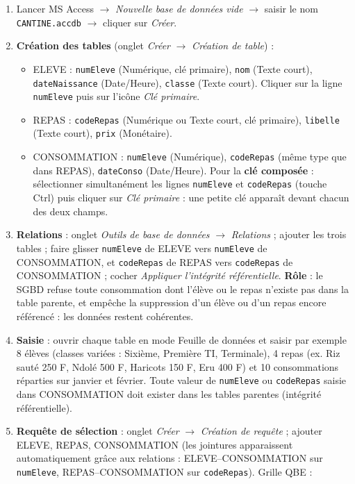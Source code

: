 \documentclass[11pt]{article}
\begin{document}
\begin{corrige}
\begin{enumerate}
  \item Lancer MS Access $\rightarrow$ \emph{Nouvelle base de données vide} $\rightarrow$ saisir le nom \texttt{CANTINE.accdb} $\rightarrow$ cliquer sur \emph{Créer}.
  \item \textbf{Création des tables} (onglet \emph{Créer} $\rightarrow$ \emph{Création de table}) :
  \begin{itemize}
    \item ELEVE : \texttt{numEleve} (Numérique, clé primaire), \texttt{nom} (Texte court), \texttt{dateNaissance} (Date/Heure), \texttt{classe} (Texte court). Cliquer sur la ligne \texttt{numEleve} puis sur l'icône \emph{Clé primaire}.
    \item REPAS : \texttt{codeRepas} (Numérique ou Texte court, clé primaire), \texttt{libelle} (Texte court), \texttt{prix} (Monétaire).
    \item CONSOMMATION : \texttt{numEleve} (Numérique), \texttt{codeRepas} (même type que dans REPAS), \texttt{dateConso} (Date/Heure). Pour la \textbf{clé composée} : sélectionner simultanément les lignes \texttt{numEleve} et \texttt{codeRepas} (touche Ctrl) puis cliquer sur \emph{Clé primaire} : une petite clé apparaît devant chacun des deux champs.
  \end{itemize}
  \item \textbf{Relations} : onglet \emph{Outils de base de données} $\rightarrow$ \emph{Relations} ; ajouter les trois tables ; faire glisser \texttt{numEleve} de ELEVE vers \texttt{numEleve} de CONSOMMATION, et \texttt{codeRepas} de REPAS vers \texttt{codeRepas} de CONSOMMATION ; cocher \emph{Appliquer l'intégrité référentielle}. \textbf{Rôle} : le SGBD refuse toute consommation dont l'élève ou le repas n'existe pas dans la table parente, et empêche la suppression d'un élève ou d'un repas encore référencé : les données restent cohérentes.
  \item \textbf{Saisie} : ouvrir chaque table en mode Feuille de données et saisir par exemple 8 élèves (classes variées : Sixième, Première TI, Terminale), 4 repas (ex. Riz sauté 250 F, Ndolé 500 F, Haricots 150 F, Eru 400 F) et 10 consommations réparties sur janvier et février. Toute valeur de \texttt{numEleve} ou \texttt{codeRepas} saisie dans CONSOMMATION doit exister dans les tables parentes (intégrité référentielle).
  \item \textbf{Requête de sélection} : onglet \emph{Créer} $\rightarrow$ \emph{Création de requête} ; ajouter ELEVE, REPAS, CONSOMMATION (les jointures apparaissent automatiquement grâce aux relations : ELEVE--CONSOMMATION sur \texttt{numEleve}, REPAS--CONSOMMATION sur \texttt{codeRepas}). Grille QBE :

\end{enumerate}
\end{corrige}
\end{document}
